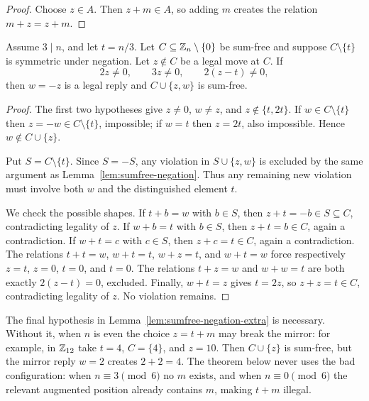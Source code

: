 \begin{proof}
Choose $z\in A$. Then $z+m\in A$, so adding $m$ creates the relation $m+z=z+m$.
\end{proof}

\begin{lemma}
\label{lem:sumfree-negation-extra}
Assume $3\mid n$, and let $t=n/3$. Let $C\subseteq\mathbb{Z}_{n}\setminus\{0\}$ be sum-free
and suppose $C\setminus\{t\}$ is symmetric under negation. Let $z\notin C$ be a legal
move at $C$. If
\[
  2z\neq 0,\qquad 3z\neq 0,\qquad 2(z-t)\neq 0,
\]
then $w=-z$ is a legal reply and $C\cup\{z,w\}$ is sum-free.
\end{lemma}

\begin{proof}
The first two hypotheses give $z\neq 0$, $w\neq z$, and $z\notin\{t,2t\}$. If
$w\in C\setminus\{t\}$ then $z=-w\in C\setminus\{t\}$, impossible; if $w=t$ then
$z=2t$, also impossible. Hence $w\notin C\cup\{z\}$.

Put $S=C\setminus\{t\}$. Since $S=-S$, any violation in $S\cup\{z,w\}$ is excluded by
the same argument as Lemma~\ref{lem:sumfree-negation}. Thus any remaining new violation
must involve both $w$ and the distinguished element $t$.

We check the possible shapes. If $t+b=w$ with $b\in S$, then $z+t=-b\in S\subseteq C$,
contradicting legality of $z$. If $w+b=t$ with $b\in S$, then $z+t=b\in C$, again a
contradiction. If $w+t=c$ with $c\in S$, then $z+c=t\in C$, again a contradiction.
The relations $t+t=w$, $w+t=t$, $w+z=t$, and $w+t=w$ force respectively
$z=t$, $z=0$, $t=0$, and $t=0$. The relations $t+z=w$ and $w+w=t$ are both exactly
$2(z-t)=0$, excluded. Finally, $w+t=z$ gives $t=2z$, so $z+z=t\in C$, contradicting
legality of $z$. No violation remains.
\end{proof}

\begin{remark}
The final hypothesis in Lemma~\ref{lem:sumfree-negation-extra} is necessary. Without it,
when $n$ is even the choice $z=t+m$ may break the mirror: for example, in $\mathbb{Z}_{12}$ take
$t=4$, $C=\{4\}$, and $z=10$. Then $C\cup\{z\}$ is sum-free, but the mirror reply
$w=2$ creates $2+2=4$. The theorem below never uses the bad configuration: when
$n\equiv 3\pmod 6$ no $m$ exists, and when $n\equiv 0\pmod 6$ the relevant augmented
position already contains $m$, making $t+m$ illegal.
\end{remark}

